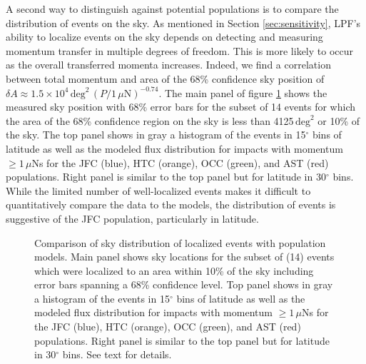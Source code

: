 \documentclass[twocolumn, trackchanges]{aastex62}
\begin{document}
A second way to distinguish against potential populations is to compare the distribution of events on the sky.  As mentioned in Section \ref{sec:sensitivity}, LPF's ability to localize events on the sky depends on detecting and measuring momentum transfer in multiple degrees of freedom. This is more likely to occur as the overall transferred momenta increases. Indeed, we find a correlation between total momentum and area of the 68\% confidence sky position of $\delta A\approx1.5\times10^4\,\textrm{deg}^2\,\left(P/1\,\mu\textrm{N}\right)^{-0.74}$. The main panel of figure \ref{fig:mapCompare} shows the measured sky position with 68\% error bars for the subset of 14 events for which the area of the 68\% confidence region on the sky is less than 4125$\,\textrm{deg}^2$ or 10\% of the sky. The top panel shows in gray a histogram of the events in 15$^\circ$ bins of latitude as well as the modeled flux distribution for impacts with momentum $\geq 1\,\mu$Ns for the JFC (blue), HTC (orange), OCC (green), and AST (red) populations. Right panel is similar to the top panel but for latitude in 30$^\circ$ bins.  While the limited number of well-localized events makes it difficult to quantitatively compare the data to the models, the distribution of events is suggestive of the JFC population, particularly in latitude. 

\begin{figure}[h!]
\vspace*{-8mm}
\caption{Comparison of sky distribution of localized events with population models. Main panel shows sky locations for the subset of (14) events which were localized to an area within 10\% of the sky including error bars spanning a 68\% confidence level. Top panel shows in gray a histogram of the events in 15$^\circ$ bins of latitude as well as the modeled flux distribution for impacts with momentum $\geq 1\,\mu$Ns for the JFC (blue), HTC (orange), OCC (green), and AST (red) populations. Right panel is similar to the top panel but for latitude in 30$^\circ$ bins. See text for details. \label{fig:mapCompare}}
\end{figure}




\end{document}
